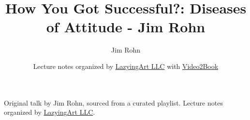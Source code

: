 \documentclass[11pt,oneside]{book}
\begin{document}
\frontmatter
\title{How You Got Successful?: Diseases of Attitude - Jim Rohn}
\author{Jim Rohn}
\date{Lecture notes organized by \href{https://lazying.art}{LazyingArt LLC} with \href{https://github.com/lachlanchen/Video2Book}{Video2Book}}
\maketitle
\begin{center}
\small Original talk by Jim Rohn, sourced from a curated playlist. Lecture notes organized by \href{https://lazying.art}{LazyingArt LLC}.
\end{center}
\clearpage
\mainmatter

\end{document}
